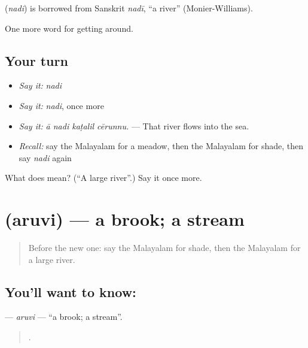 \begin{cousinweb}
\textbf{} (\emph{nadi}) is borrowed from Sanskrit \emph{nadī}, \textquotedblleft{}a river\textquotedblright{} (Monier-Williams).
\end{cousinweb}

\begin{grammarlens}[title={What you've built}]
One more word for getting around.
\end{grammarlens}

\subsection*{Your turn}
\begin{itemize}
\raggedright
  \item \emph{Say it:} \emph{nadi}
  \item \emph{Say it:} \emph{nadi}, once more
  \item \emph{Say it:} \emph{ā nadi kaṭalil cērunnu.} — That river flows into the sea.
  \item \emph{Recall:} say the Malayalam for a meadow, then the Malayalam for shade, then say \emph{nadi} again
\end{itemize}

\begin{tcolorbox}[breakable,colback=teal!4,colframe=teal!35!black,title={Before you move on}]
What does  mean? (\textquotedblleft{}A large river\textquotedblright{}.) Say it once more.
\end{tcolorbox}
\section[\texorpdfstring{\ml{അരുവി} (aruvi)}{അരുവി (aruvi)}]{ (aruvi) — a brook; a stream}

\label{lesson:ML-C496-aruvi}



\begin{quote}
Before the new one: say the Malayalam for shade, then the Malayalam for a large river.
\end{quote}

\subsection*{You'll want to know: }
\textbf{} — \emph{aruvi} — \textquotedblleft{}a brook; a stream\textquotedblright{}.

\begin{quote}
    .
\end{quote}


